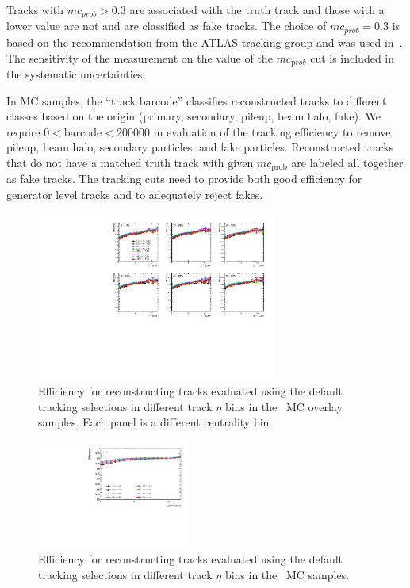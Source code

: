 Tracks with $mc_{prob} > 0.3$ are associated with the truth track and those with a lower value are not and are classified as fake tracks.
The choice of $mc_{prob} = 0.3$ is based on the recommendation from the ATLAS tracking group and was used in~\cite{201865}.
The sensitivity of the measurement on the value of the $mc_{\mathrm prob}$ cut is included in the systematic uncertainties.

In MC samples, the ``track barcode'' classifies reconstructed tracks to different classes based on the origin (primary, secondary, pileup, beam halo, fake).
We require $0 < \mathrm{barcode} < 200000$ in evaluation of the tracking efficiency to remove pileup, beam halo, secondary particles, and fake particles.
Reconstructed tracks that do not have a matched truth track with given $mc_{\mathrm{prob}}$ are labeled all together as fake tracks.
The tracking cuts need to provide both good efficiency for generator level tracks and to adequately reject fakes.

\begin{figure}
\centering
\includegraphics[width=0.7\textwidth]{figures/main/corrections/eff_cent_trketa_PbPb_ppTight.pdf}
\caption{Efficiency for reconstructing tracks evaluated using the default tracking selections in different track $\eta$ bins in the \pbpb\ MC overlay samples.
Each panel is a different centrality bin.}
\label{fig:pbpbeffdefault_final}
\end{figure}

\begin{figure}
\centering
\includegraphics[width=0.45\textwidth]{figures/main/corrections/eff_cent_trketa_pp_ppTight.pdf}
\caption{Efficiency for reconstructing tracks evaluated using the default tracking selections in different track $\eta$ bins in the \pp\ MC samples.}
\label{fig:ppeffdefault_final}
\end{figure}

